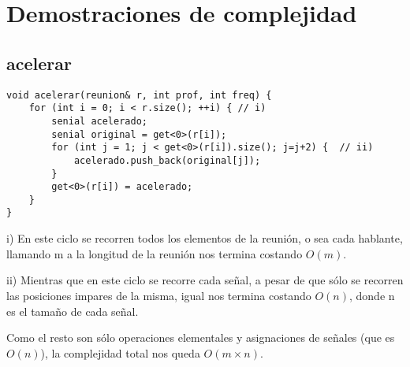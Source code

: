 \documentclass{article}
\begin{document}
\maketitle

\tableofcontents
\newpage


\newpage
{}
\section*{Demostraciones de complejidad}
\vspace{0.5cm}
\subsection{acelerar}
\begin{lstlisting}
void acelerar(reunion& r, int prof, int freq) {
    for (int i = 0; i < r.size(); ++i) { // i)
        senial acelerado;
        senial original = get<0>(r[i]);
        for (int j = 1; j < get<0>(r[i]).size(); j=j+2) {  // ii)
            acelerado.push_back(original[j]);
        }
        get<0>(r[i]) = acelerado;
    }
}
\end{lstlisting}
i) En este ciclo se recorren todos los elementos de la reunión, o sea cada hablante, llamando m a la longitud de la reunión nos termina costando $O(m)$.

ii) Mientras que en este ciclo se recorre cada señal, a pesar de que sólo se recorren las posiciones impares de la misma, igual nos termina costando $O(n)$, donde n es el tamaño de cada señal.

Como el resto son sólo operaciones elementales y asignaciones de señales (que es $O(n)$), la complejidad total nos queda $O(m \times n)$.


\newpage
\end{document}
